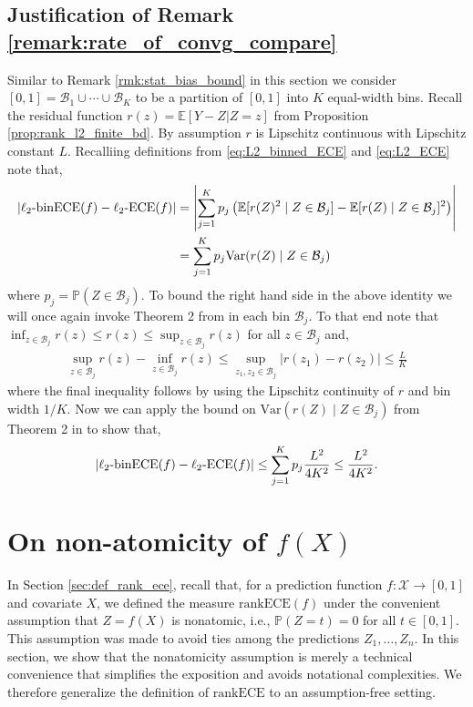 \documentclass[11pt]{article}
\numberwithin{equation}{section}
\theoremstyle{definition}
\newcommand{\E}{\mathbb{E}}
\renewcommand{\P}{\mathbb{P}}
\newcommand{\cB}{\mathcal{B}}
\newcommand{\cX}{\mathcal{X}}
\newcommand{\ra}{\rightarrow}
\newcommand{\Var}{\mathrm{Var}}
\newcommand{\ECE}{\mathrm{ECE}}
\newcommand{\lECE}{\ell_2\textnormal{-}\ECE}
\newcommand{\binECE}{\mathrm{binECE}}
\newcommand{\lbinECE}{\ell_2\textnormal{-}\binECE}
\newcommand{\rankECE}{\mathrm{rankECE}}
\begin{document}
\subsection{Justification of Remark \ref{remark:rate_of_convg_compare}}\label{sec:remark_lip_rate}
Similar to Remark \ref{rmk:stat_bias_bound} in this section we consider $[0,1] = \cB_1\cup\cdots\cup\cB_K$ to be a partition of $[0,1]$ into $K$ equal-width bins.
Recall the residual function $r(z) = \E[Y-Z|Z=z]$ from Proposition \ref{prop:rank_l2_finite_bd}. By assumption $r$ is Lipschitz continuous with Lipschitz constant $L$. Recalliing definitions from \eqref{eq:L2_binned_ECE} and \eqref{eq:L2_ECE} note that,
\begin{align*}
    \left|\lbinECE(f) - \lECE(f)\right| 
    & = \left|\sum_{j=1}^{K}p_j\left(\E[r(Z)^2\mid Z\in \cB_j] - \E[r(Z)\mid Z\in \cB_j]^2\right)\right|\\
    & = \sum_{j=1}^{K}p_j\Var(r(Z)\mid Z\in \cB_j)
\end{align*}
where $p_j = \P(Z\in \cB_j)$. To bound the right hand side in the above identity we will once again invoke Theorem 2 from \cite{bhatia2000better} in each bin $\cB_j$. To that end note that $\inf_{z\in \cB_j}r(z)\leq r(z)\leq \sup_{z\in \cB_j}r(z)$ for all $z\in \cB_j$ and,
\begin{align*}
    \sup_{z\in \cB_j}r(z) - \inf_{z\in \cB_j}r(z)\leq \sup_{z_1, z_2\in \cB_j}\left|r(z_1) - r(z_2)\right|\leq \frac{L}{K}
\end{align*}
where the final inequality follows by using the Lipschitz continuity of $r$ and bin width $1/K$. Now we can apply the bound on $\Var(r(Z)\mid Z\in \cB_j)$ from Theorem 2 in \cite{bhatia2000better} to show that,
\begin{align*}
    \left|\lbinECE(f) - \lECE(f)\right|\leq\sum_{j=1}^{K}p_j\frac{L^2}{4K^2} \leq \frac{L^2}{4K^2}.
\end{align*}

\section{On non-atomicity of $f(X)$}\label{appendix:atomic}
In Section \ref{sec:def_rank_ece}, recall that, for a prediction function $f:\cX\ra[0,1]$ and covariate $X$, we defined the measure $\rankECE(f)$ under the convenient assumption that $Z=f(X)$ is nonatomic, i.e., $\P(Z=t)=0$ for all $t\in[0,1]$. This assumption was made to avoid ties among the predictions $Z_1,\ldots,Z_n$. In this section, we show that the nonatomicity assumption is merely a technical convenience that simplifies the exposition and avoids notational complexities. We therefore generalize the definition of $\rankECE$ to an assumption-free setting. 
\end{document}
